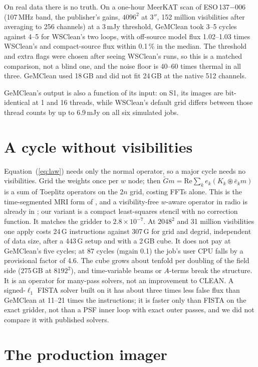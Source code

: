 \documentclass[twocolumn,10pt]{article}
\theoremstyle{remark}
\begin{document}
On real data there is no truth. On a one-hour MeerKAT scan of ESO\,137$-$006 (107\,MHz band, the publisher's gains, $4096^2$ at $3''$, 152 million visibilities after averaging to 256 channels) at a 3\,mJy threshold, GeMClean took 3--5 cycles against 4--5 for WSClean's two loops, with off-source model flux 1.02--1.03 times WSClean's and compact-source flux within 0.1\,\% in the median. The threshold and extra flags were chosen after seeing WSClean's runs, so this is a matched comparison, not a blind one, and the noise floor is 40--60 times thermal in all three. GeMClean used 18\,GB and did not fit 24\,GB at the native 512 channels.

GeMClean's output is also a function of its input: on S1, its images are bit-identical at 1 and 16 threads, while WSClean's default grid differs between those thread counts by up to 6.9\,mJy on all six simulated jobs.

\section{A cycle without visibilities}

Equation~(\ref{eq:law}) needs only the normal operator, so a major cycle needs no visibilities. Grid the weights once per $w$ node; then $\tilde Gm=\mathrm{Re}\sum_ke_k(K_k\circledast\bar e_km)$ is a sum of Toeplitz operators on the $2n$ grid, costing FFTs alone. This is the time-segmented MRI form of \citet{fessler05}, and a visibility-free $w$-aware operator in radio is already in \citet{dabbech26}; our variant is a compact least-squares stencil with no correction function. It matches the gridder to $2.8\times10^{-7}$. At $2048^2$ and 31 million visibilities one apply costs 24\,G instructions against 307\,G for grid and degrid, independent of data size, after a 443\,G setup and with a 2\,GB cube. It does not pay at GeMClean's five cycles; at 87 cycles (mgain 0.1) the job's user CPU falls by a provisional factor of 4.6. The cube grows about tenfold per doubling of the field side (275\,GB at $8192^2$), and time-variable beams or $A$-terms break the structure. It is an operator for many-pass solvers, not an improvement to CLEAN. A signed-$\ell_1$ FISTA solver built on it has about three times less false flux than GeMClean at 11--21 times the instructions; it is faster only than FISTA on the exact gridder, not than a PSF inner loop with exact outer passes, and we did not compare it with published solvers.

\section{The production imager}
\end{document}
